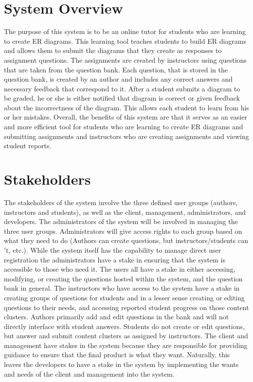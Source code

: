 \chapter {System Overview}

The purpose of this system is to be an online tutor for students who are learning to create ER diagrams. This learning tool teaches students to build ER diagrams and allows them to submit the diagrams that they create as responses to assignment questions. The assignments are created by instructors using questions that are taken from the question bank. Each question, that is stored in 
the question bank, is created by an author and includes any correct answers and necessary feedback that correspond to it. After a student submits a diagram to be graded, he or she is either notified that diagram is correct or given feedback about the incorrectness of the diagram. This allows each student to learn from his or her mistakes. Overall, the benefits of this system are that it serves as an easier and more efficient tool for students who are learning to create ER diagrams and submitting assignments and instructors who are creating assignments and viewing student reports.  

\chapter{Stakeholders}
The stakeholders of the system involve the three defined user groups (authors, instructors and students), as well as the client, management, administrators, and developers. The administrators of the system will be involved in managing the three user groups. Administrators will give access rights to each group based on what they need to do (Authors can create questions, but instructors/students can$'$t, etc.). While the system itself has the capability to manage direct user registration the administrators have a stake in ensuring that the system is accessible to those who need it. The users all have a stake in either accessing, modifying, or creating the questions hosted within the system, and the question bank in general. The instructors who have access to the system have a stake in creating groups of questions for students and in a lesser sense creating or editing questions to their needs, and accessing reported student progress on those content clusters. Authors primarily add and edit questions in the bank and will not directly interface with student answers. Students do not create or edit questions, but answer and submit content clusters as assigned by instructors. The client and management have stakes in the system because they are responsible for providing guidance to ensure that the final product is what they want. Naturally, this leaves the developers to have a stake in the system by implementing the wants and needs of the client and management into the system.



